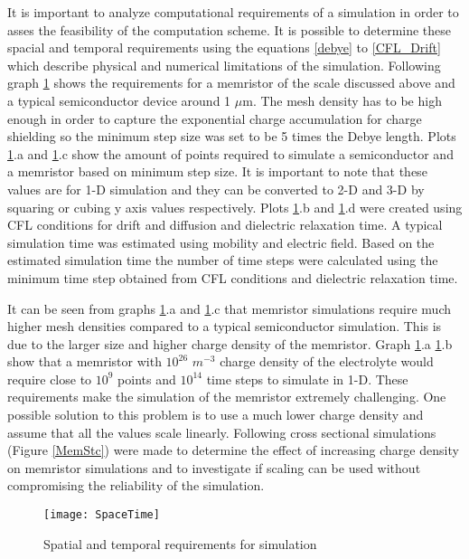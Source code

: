 It is important to analyze computational requirements of a simulation in order to asses the feasibility of the computation scheme. It is possible to determine these spacial and temporal requirements using the equations \ref{debye} to \ref{CFL_Drift} which describe physical and numerical limitations of the simulation. Following graph \ref{SpaceTime} shows the requirements for a memristor of the scale discussed above and a typical semiconductor device around 1 $\mu$m. The mesh density has to be high enough in order to capture the exponential charge accumulation for charge shielding so the minimum step size was set to be 5 times the Debye length. Plots \ref{SpaceTime}.a and \ref{SpaceTime}.c show the amount of points required to simulate a semiconductor and a memristor based on minimum step size. It is important to note that these values are for 1-D simulation and they can be converted to 2-D and 3-D by squaring or cubing y axis values respectively. Plots \ref{SpaceTime}.b and \ref{SpaceTime}.d were created using CFL conditions for drift and diffusion and dielectric relaxation time. A typical simulation time was estimated using mobility and electric field. Based on the estimated simulation time the number of time steps were calculated using the minimum time step obtained from CFL conditions and dielectric relaxation time.

It can be seen from graphs \ref{SpaceTime}.a and \ref{SpaceTime}.c that memristor simulations require much higher mesh densities compared to a typical semiconductor simulation. This is due to the larger size and higher charge density of the memristor. Graph \ref{SpaceTime}.a \ref{SpaceTime}.b show that a memristor with $10^{26}$ $m^{-3}$ charge density of the electrolyte would require close to $10^9$ points and $10^{14}$ time steps to simulate in 1-D. These requirements make the simulation of the memristor extremely challenging. One possible solution to this problem is to use a much lower charge density and assume that all the values scale linearly. Following cross sectional simulations (Figure \ref{MemStc}) were made to determine the effect of increasing charge density on memristor simulations and to investigate if scaling can be used without compromising the reliability of the simulation.

\begin{landscape}
\begin{figure}[htp]
\centering
\texttt{[image: SpaceTime]}
\caption{Spatial and temporal requirements for simulation} 
\label{SpaceTime}
\end{figure}
\end{landscape}

